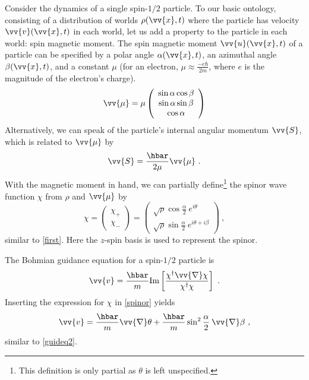 \documentclass[onecolumn,secnumarabic,balancelastpage,amsmath,amssymb,nofootinbib]{article}
\begin{document}
Consider the dynamics of a single spin-$1/2$ particle.  To our basic ontology, consisting of a distribution of worlds $\rho(\vv{x},t)$ where the particle has velocity $\vv{v}(\vv{x},t)$ in each world, let us add a property to the particle in each world: spin magnetic moment.  The spin magnetic moment $\vv{u}(\vv{x},t)$ of a particle can be specified by a polar angle $\alpha(\vv{x},t)$, an azimuthal angle $\beta(\vv{x},t)$, and a constant $\mu$ (for an electron, $\mu\approx\frac{-e \hbar}{2 m}$, where $e$ is the magnitude of the electron's charge).
\begin{equation}
\vv{\mu}=\mu \left(\begin{array}{c}\sin\alpha\cos\beta \\ \sin\alpha\sin\beta \\ \cos \alpha \end{array} \right)
\label{mumu}
\end{equation}
Alternatively, we can speak of the particle's internal angular momentum $\vv{S}$, which is related to $\vv{\mu}$ by
\begin{equation}
\vv{S}=\frac{\hbar}{2 \mu} \vv{\mu}\ .
\label{crispy}
\end{equation}
With the magnetic moment in hand, we can partially define\footnote{This definition is only partial as $\theta$ is left unspecified.} the spinor wave function $\chi$ from $\rho$ and $\vv{\mu}$ by
\begin{equation}
\chi=\left(\begin{array}{c}\chi_+ \\ \chi_- \end{array}\right)=\left(\begin{array}{c} \sqrt{\rho}\cos\frac{\alpha}{2} \: e^{i\theta} \\ \sqrt{\rho}\sin\frac{\alpha}{2} \: e^{i\theta+i\beta} \end{array}\right)\ ,
\label{spinor}
\end{equation}
similar to \eqref{first}.  Here the $z$-spin basis is used to represent the spinor.

The Bohmian guidance equation for a spin-$1/2$ particle is
\begin{equation}
\vv{v}=\frac{\hbar}{m}\mbox{Im}\left[\frac{\chi^\dagger \vv{\nabla} \chi}{\chi^\dagger \chi}\right]\ .
\label{}
\end{equation}
Inserting the expression for $\chi$ in \eqref{spinor} yields
\begin{equation}
\vv{v}=\frac{\hbar}{m}\vv{\nabla}\theta+\frac{\hbar}{m}\sin^2\frac{\alpha}{2}\: \vv{\nabla}\beta\ ,
\label{guideq3}
\end{equation}
similar to \eqref{guideq2}.
\end{document}
